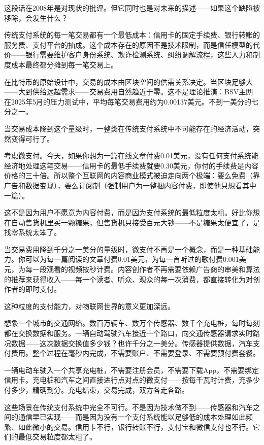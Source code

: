 \documentclass[a4paper,12pt,openany]{ctexbook}
\begin{document}
这段话在2008年是对现状的批评。但它同时也是对未来的描述——如果这个缺陷被移除，会发生什么？

传统支付系统的每一笔交易都有一个最低成本：信用卡的固定手续费、银行转账的服务费、支付平台的抽成。这个成本存在的原因不是技术限制，而是信任模型的代价——银行需要维护客户身份系统、欺诈检测系统、纠纷调解流程，这些人力和制度成本最终都分摊到每一笔交易上。

在比特币的原始设计中，交易的成本由区块空间的供需关系决定。当区块足够大——大到供给远超需求——交易费用自然趋近于零。这不是理论推演：BSV主网在2025年5月的压力测试中，平均每笔交易费用约为0.00137美元。不到一美分的七分之一。

当交易成本降到这个量级时，一整类在传统支付系统中不可能存在的经济活动，突然变得可行了。

考虑微支付。今天，如果你想为一篇在线文章付费0.01美元，没有任何支付系统能经济地处理这笔交易——信用卡的最低手续费就要0.30美元，你付的手续费是内容价格的三十倍。所以整个互联网的内容商业模式被迫走向两个极端：要么免费（靠广告和数据变现），要么订阅制（强制用户为一整捆内容付费，即使他只想看其中一篇）。

这不是因为用户不愿意为内容付费，而是因为支付系统的最低粒度太粗。好比你想在自动售货机里买一颗糖果，但售货机只接受百元大钞——不是糖果太便宜了，是找零系统太笨了。

当交易费用降到千分之一美分的量级时，微支付不再是一个概念，而是一种基础能力。你可以为每一篇阅读的文章付费0.01美元，为每一首听过的歌付费0.001美元，为每一段观看的视频按秒计费。内容创作者不再需要依赖广告商的审美和算法的推荐来获得收入——每一个读者、听众、观众的每一次消费，都直接转化为对创作者的即时支付。

这种粒度的支付能力，对物联网世界的意义更加深远。

想象一个城市的交通网络。数百万辆车、数万个传感器、数千个充电桩，每时每刻都在交换数据和服务。一辆自动驾驶汽车接近一个路口，向交通传感器请求实时路况数据——这次数据交换值多少钱？也许千分之一美分。传感器提供数据，汽车支付费用。整个过程在毫秒内完成，不需要账户、不需要登录、不需要预付费套餐。

一辆电动车驶入一个共享充电桩，不需要注册会员，不需要下载App，不需要绑定信用卡。充电桩和汽车之间直接进行点对点的微支付——按每千瓦时计费，充多少付多少，精确到分。充电结束，交易完成，双方各走各路。

这些场景在传统支付系统中完全不可行。不是因为技术做不到——传感器和汽车之间的通信早已实现——而是因为没有一个支付系统能以足够低的成本处理如此频繁、如此微小的交易。信用卡不行，银行转账不行，支付宝和微信支付也不行。它们的最低交易粒度都太粗了。
\end{document}
